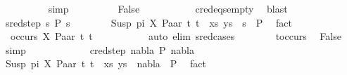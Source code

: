 \begin{isabellebody}
\ \ \ \ \ \ \ \ \isamarkupfalse%
\ simp\isanewline
\ \ \ \ \ \ \isamarkupfalse%
\ \isamarkupfalse%
\ False\ \isanewline
\ \ \ \ \ \ \ \ \isamarkupfalse%
\ c{\isacharunderscore}{\kern0pt}red{\isacharunderscore}{\kern0pt}eqs{\isacharunderscore}{\kern0pt}empty\ \isamarkupfalse%
\ blast\isanewline
\ \ \ \ \isamarkupfalse%
\isanewline
\ \ \ \ \ \ \isamarkupfalse%
\ {\isacharparenleft}{\kern0pt}sred{\isacharunderscore}{\kern0pt}step\ s{}\ P{}\ s{}{\isacharparenright}{\kern0pt}\isanewline
\ \ \ \ \ \ \isamarkupfalse%
\ {\isachardoublequoteopen}{\isacharparenleft}{\kern0pt}{\isacharparenleft}{\kern0pt}Susp\ pi\ X{\isacharcomma}{\kern0pt}\ Paar\ t{}\ t{}{\isacharparenright}{\kern0pt}\ {\isacharhash}{\kern0pt}\ xs{\isacharcomma}{\kern0pt}\ ys{\isacharparenright}{\kern0pt}\ {\isasymturnstile}\ s{}\ {\isasymleadsto}\ P{}{\isachardoublequoteclose}\ \isamarkupfalse%
\ fact\isanewline
\ \ \ \ \ \ \isamarkupfalse%
\ {\isachardoublequoteopen}{\isasymnot}\ occurs\ X\ {\isacharparenleft}{\kern0pt}Paar\ t{}\ t{}{\isacharparenright}{\kern0pt}{\isachardoublequoteclose}\ \isanewline
\ \ \ \ \ \ \ \ \isamarkupfalse%
\ {\isacharparenleft}{\kern0pt}auto\ elim{\isacharcolon}{\kern0pt}\ s{\isacharunderscore}{\kern0pt}red{\isachardot}{\kern0pt}cases{\isacharparenright}{\kern0pt}\isanewline
\ \ \ \ \ \ \isamarkupfalse%
\ t{\isacharunderscore}{\kern0pt}occurs\ \isamarkupfalse%
\ False\ \isamarkupfalse%
\ simp\isanewline
\ \ \ \ \isamarkupfalse%
\isanewline
\ \ \ \ \ \ \isamarkupfalse%
\ {\isacharparenleft}{\kern0pt}cred{\isacharunderscore}{\kern0pt}step\ nabla{}\ P{}\ nabla{}{\isacharparenright}{\kern0pt}\isanewline
\ \ \ \ \ \ \isamarkupfalse%
\ {\isachardoublequoteopen}{\isacharparenleft}{\kern0pt}{\isacharparenleft}{\kern0pt}Susp\ pi\ X{\isacharcomma}{\kern0pt}\ Paar\ t{}\ t{}{\isacharparenright}{\kern0pt}\ {\isacharhash}{\kern0pt}\ xs{\isacharcomma}{\kern0pt}\ ys{\isacharparenright}{\kern0pt}\ {\isasymturnstile}\ nabla{}\ {\isasymrightarrow}\ P{}{\isachardoublequoteclose}\ \isamarkupfalse%
\ fact\isanewline
\ \ \ \ \ \ \ \isamarkupfalse%

\end{isabellebody}
